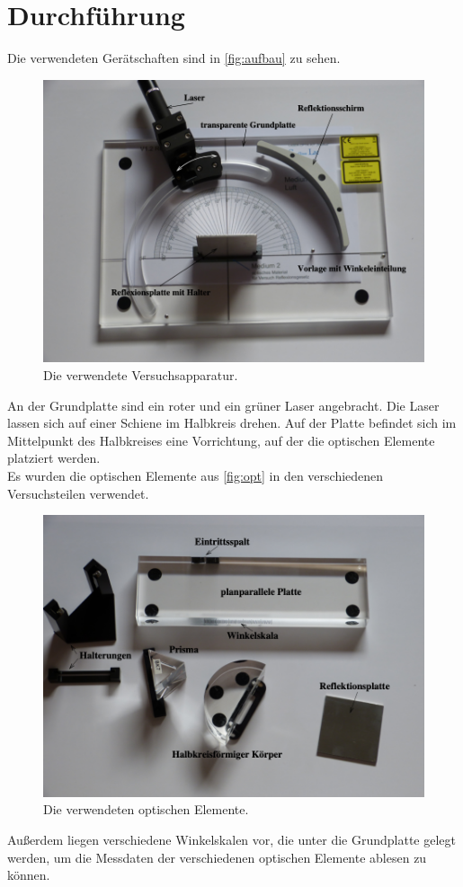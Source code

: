 \section{Durchführung}
\label{sec:Durchführung}

Die verwendeten Gerätschaften sind in \autoref{fig:aufbau} zu sehen.
\begin{figure}[H]
  \centering
  \includegraphics{content/aufbau.png}
  \caption{Die verwendete Versuchsapparatur. \cite{sample}}
  \label{fig:aufbau}
\end{figure}
An der Grundplatte sind ein roter und ein grüner Laser angebracht. 
Die Laser lassen sich auf einer Schiene im Halbkreis drehen.
Auf der Platte befindet sich im Mittelpunkt des Halbkreises eine 
Vorrichtung, auf der die optischen Elemente platziert werden.\\
Es wurden die optischen Elemente aus \autoref{fig:opt} in den verschiedenen
Versuchsteilen verwendet.\\
\begin{figure}[H]
    \centering
    \includegraphics{content/opt.png}
    \caption{Die verwendeten optischen Elemente. \cite{sample}}
    \label{fig:opt}
  \end{figure}
Außerdem liegen verschiedene Winkelskalen vor, die unter die Grundplatte gelegt 
werden, um die Messdaten der verschiedenen optischen Elemente ablesen zu können.

